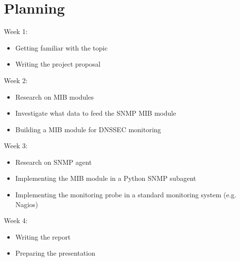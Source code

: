 \section{Planning}
\label{chap:Planning}
Week 1:
\begin{itemize}
\item Getting familiar with the topic
\item Writing the project proposal
\end{itemize}
Week 2:
\begin{itemize}
\item Research on MIB modules
\item Investigate what data to feed the SNMP MIB module
\item Building a MIB module for DNSSEC monitoring
\end{itemize}
Week 3:
\begin{itemize}
\item Research on SNMP agent
\item Implementing the MIB module in a Python SNMP subagent
\item Implementing the monitoring probe in a standard monitoring system (e.g. Nagios)
\end{itemize}
Week 4:
\begin{itemize}
\item Writing the report
\item Preparing the presentation
\end{itemize}